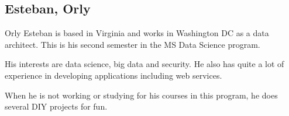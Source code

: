\subsection{Esteban, Orly}
Orly Esteban is based in Virginia and works in Washington DC as a data architect.  This is his second semester in the MS Data Science program.

 

His interests are data science, big data and security. He also has quite a lot of experience in developing applications including web services.

When he is not working or studying for his courses in this program, he does several DIY projects for fun.